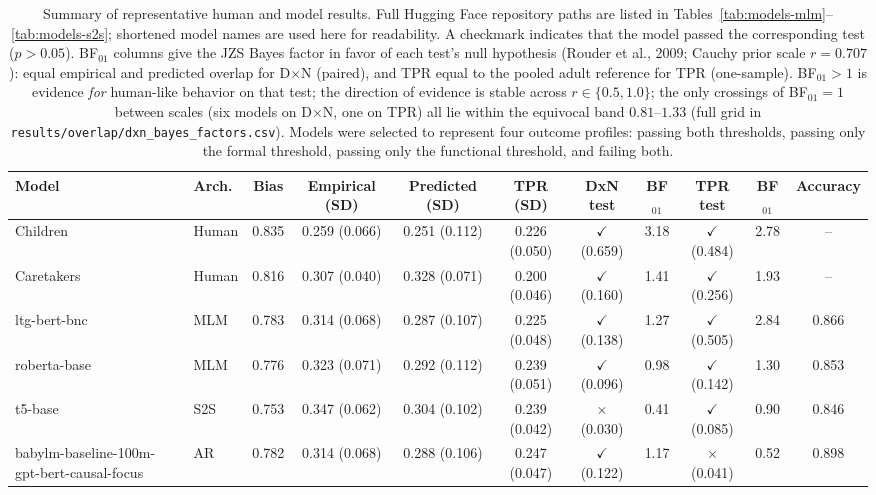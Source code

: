 \begin{table}[t]
\centering
\footnotesize
\caption{Summary of representative human and model results. Full Hugging Face repository paths are listed in Tables~\ref{tab:models-mlm}--\ref{tab:models-s2s}; shortened model names are used here for readability. A checkmark indicates that the model passed the corresponding test ($p > 0.05$). BF$_{01}$ columns give the JZS Bayes factor in favor of each test's null hypothesis (Rouder et al., 2009; Cauchy prior scale $r=0.707$): equal empirical and predicted overlap for D$\times$N (paired), and TPR equal to the pooled adult reference for TPR (one-sample). BF$_{01} > 1$ is evidence \emph{for} human-like behavior on that test; the direction of evidence is stable across $r \in \{0.5, 1.0\}$; the only crossings of BF$_{01}=1$ between scales (six models on D$\times$N, one on TPR) all lie within the equivocal band $0.81$--$1.33$ (full grid in \texttt{results/overlap/dxn\_bayes\_factors.csv}). Models were selected to represent four outcome profiles: passing both thresholds, passing only the formal threshold, passing only the functional threshold, and failing both.}
\label{tab:summary-results}
\begin{adjustbox}{max width=\textwidth}
\begin{tabular}{llccccccccc}
\toprule
Model & Arch. & Bias & Empirical (SD) & Predicted (SD) & TPR (SD) & DxN test & BF$_{01}$ & TPR test & BF$_{01}$ & Accuracy \\
\midrule
Children & Human & 0.835 & 0.259 (0.066) & 0.251 (0.112) & 0.226 (0.050) & $\checkmark$ (0.659) & 3.18 & $\checkmark$ (0.484) & 2.78 & -- \\
Caretakers & Human & 0.816 & 0.307 (0.040) & 0.328 (0.071) & 0.200 (0.046) & $\checkmark$ (0.160) & 1.41 & $\checkmark$ (0.256) & 1.93 & -- \\
ltg-bert-bnc & MLM & 0.783 & 0.314 (0.068) & 0.287 (0.107) & 0.225 (0.048) & $\checkmark$ (0.138) & 1.27 & $\checkmark$ (0.505) & 2.84 & 0.866 \\
roberta-base & MLM & 0.776 & 0.323 (0.071) & 0.292 (0.112) & 0.239 (0.051) & $\checkmark$ (0.096) & 0.98 & $\checkmark$ (0.142) & 1.30 & 0.853 \\
t5-base & S2S & 0.753 & 0.347 (0.062) & 0.304 (0.102) & 0.239 (0.042) & $\times$ (0.030) & 0.41 & $\checkmark$ (0.085) & 0.90 & 0.846 \\
babylm-baseline-100m-gpt-bert-causal-focus & AR & 0.782 & 0.314 (0.068) & 0.288 (0.106) & 0.247 (0.047) & $\checkmark$ (0.122) & 1.17 & $\times$ (0.041) & 0.52 & 0.898 \\

\end{tabular}
\end{adjustbox}
\end{table}
